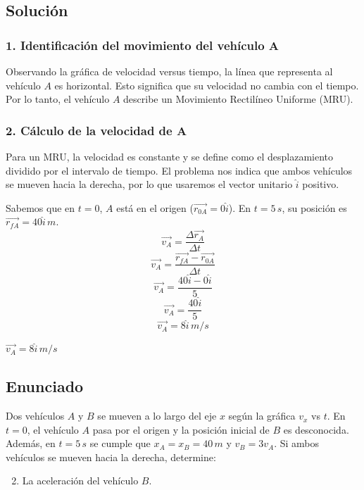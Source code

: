 \documentclass[12pt, a4paper]{article}
\begin{document}
\subsection*{Solución}

\subsubsection*{1. Identificación del movimiento del vehículo A}
Observando la gráfica de velocidad versus tiempo, la línea que representa al vehículo $A$ es horizontal. Esto significa que su velocidad no cambia con el tiempo. Por lo tanto, el vehículo $A$ describe un Movimiento Rectilíneo Uniforme (MRU).

\subsubsection*{2. Cálculo de la velocidad de A}
Para un MRU, la velocidad es constante y se define como el desplazamiento dividido por el intervalo de tiempo. El problema nos indica que ambos vehículos se mueven hacia la derecha, por lo que usaremos el vector unitario $\hat{i}$ positivo.

Sabemos que en $t = 0$, $A$ está en el origen ($\vec{r_{0A}} = 0\hat{i}$). En $t = 5 \, \si{s}$, su posición es $\vec{r_{fA}} = 40\hat{i} \, \si{m}$.
$$ \vec{v_A} = \frac{\Delta \vec{r_A}}{\Delta t} $$
$$ \vec{v_A} = \frac{\vec{r_{fA}} - \vec{r_{0A}}}{\Delta t} $$
$$ \vec{v_A} = \frac{40\hat{i} - 0\hat{i}}{5} $$
$$ \vec{v_A} = \frac{40\hat{i}}{5} $$
$$ \vec{v_A} = 8\hat{i} \, \si{m/s} $$

\begin{tcolorbox}[colback=green!5!white, colframe=green!50!black, title=Respuesta Final]
\centering $\vec{v_A} = 8\hat{i} \, \si{m/s}$
\end{tcolorbox}

\newpage

\subsection*{Enunciado}
Dos vehículos $A$ y $B$ se mueven a lo largo del eje $x$ según la gráfica $v_x$ vs $t$. En $t = 0$, el vehículo $A$ pasa por el origen y la posición inicial de $B$ es desconocida. Además, en $t = 5 \, \si{s}$ se cumple que $x_A = x_B = 40 \, \si{m}$ y $v_B = 3v_A$. Si ambos vehículos se mueven hacia la derecha, determine:
\begin{enumerate}[label=\alph*)]
    \setcounter{enumi}{1}
    \item La aceleración del vehículo $B$.
\end{enumerate}
\end{document}
